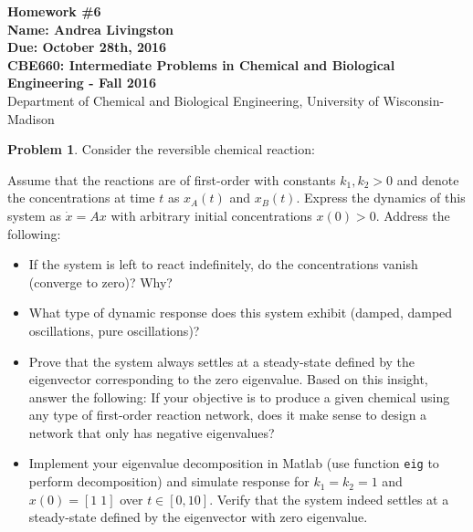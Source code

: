 \documentclass[10pt]{article}
\begin{document}
\begin{center}
{\Large\bf Homework \#6}\\
 {\bf Name: Andrea Livingston}\\
 {\bf Due: October 28th, 2016}\\
 {\bf CBE660: Intermediate Problems in Chemical and Biological
Engineering\; -\; Fall 2016}\\
Department of Chemical and Biological Engineering, University of Wisconsin-Madison
\end{center}

\noindent\colorbox{mygray}{\begin{minipage}{\textwidth}
  {\bf Problem 1}.  Consider the reversible chemical reaction: 
  \begin{center}
  \end{center}
 Assume that the reactions are of first-order with constants $k_1,k_2>0$ and denote the concentrations  at time $t$ as $x_A(t)$ and $x_B(t)$. Express the dynamics of this system as $\dot{x}=Ax$ with arbitrary initial concentrations  $x(0)>0$. Address the following:
  \begin{itemize}
  \item If the system is left to react indefinitely, do the concentrations vanish (converge to zero)? Why? 
  \item What type of dynamic response does this system exhibit (damped, damped oscillations, pure oscillations)? 
  \item Prove that the system always settles at a steady-state defined by the eigenvector corresponding to the zero eigenvalue. Based on this insight, answer the following: If your objective is to produce a given chemical using any type of first-order reaction network, does it make sense to design a network that only has negative eigenvalues? 
  \item Implement your eigenvalue decomposition in Matlab (use function {\tt eig} to perform decomposition) and simulate response for $k_1=k_2=1$ and $x(0)=[1\;1]$ over $t\in [0,10]$.  Verify that the system indeed settles at a steady-state defined by the eigenvector with zero eigenvalue. 
   \end{itemize}
\end{minipage}}
\\
\end{document}
